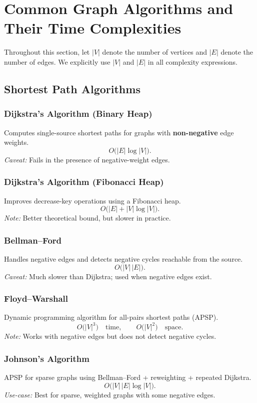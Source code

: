 \documentclass[9pt]{extarticle}
\begin{document}
\section{Common Graph Algorithms and Their Time Complexities}

Throughout this section, let $|V|$ denote the number of vertices and 
$|E|$ denote the number of edges.  We explicitly use $|V|$ and $|E|$ 
in all complexity expressions.

\subsection{Shortest Path Algorithms}

\subsubsection{Dijkstra's Algorithm (Binary Heap)}
Computes single-source shortest paths for graphs with \textbf{non-negative} edge weights.
\[
O\bigl(|E| \log |V|\bigr).
\]
\emph{Caveat:} Fails in the presence of negative-weight edges.

\subsubsection{Dijkstra's Algorithm (Fibonacci Heap)}
Improves decrease-key operations using a Fibonacci heap.
\[
O\bigl(|E| + |V| \log |V|\bigr).
\]
\emph{Note:} Better theoretical bound, but slower in practice.

\subsubsection{Bellman--Ford}
Handles negative edges and detects negative cycles reachable from the source.
\[
O\bigl(|V| \, |E|\bigr).
\]
\emph{Caveat:} Much slower than Dijkstra; used when negative edges exist.

\subsubsection{Floyd--Warshall}
Dynamic programming algorithm for all-pairs shortest paths (APSP).
\[
O\bigl(|V|^{3}\bigr) \quad \text{time}, \qquad O\bigl(|V|^{2}\bigr) \quad \text{space}.
\]
\emph{Note:} Works with negative edges but does not detect negative cycles.

\subsubsection{Johnson's Algorithm}
APSP for sparse graphs using Bellman--Ford + reweighting + repeated Dijkstra.
\[
O\bigl(|V| \, |E| \log |V|\bigr).
\]
\emph{Use-case:} Best for sparse, weighted graphs with some negative edges.
\end{document}
